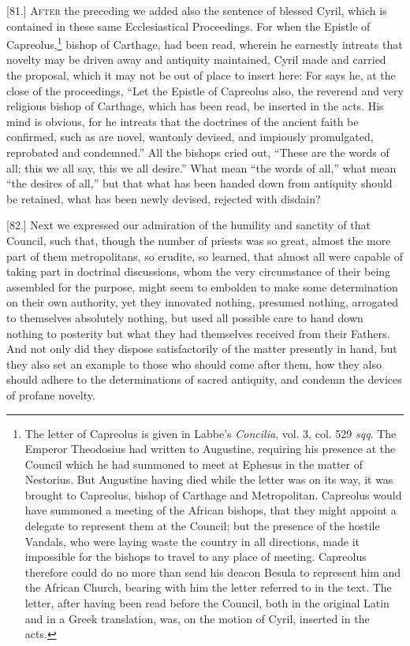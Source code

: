 
[81.] \textsc{After} the preceding we added also the sentence of blessed Cyril, which is contained in these same Ecclesiastical Proceedings. For when the Epistle of Capreolus,\footnote{The letter of Capreolus is given in Labbe’s \emph{Concilia}, vol. 3, col. 529 \emph{sqq}. The Emperor Theodosius had written to Augustine, requiring his presence at the Council which he had summoned to meet at Ephesus in the matter of Nestorius. But Augustine having died while the letter was on its way, it was brought to Capreolus, bishop of Carthage and Metropolitan. Capreolus would have summoned a meeting of the African bishops, that they might appoint a delegate to represent them at the Council; but the presence of the hostile Vandals, who were laying waste the country in all directions, made it impossible for the bishops to travel to any place of meeting. Capreolus therefore could do no more than send his deacon Besula to represent him and the African Church, bearing with him the letter referred to in the text. The letter, after having been read before the Council, both in the original Latin and in a Greek translation, was, on the motion of Cyril, inserted in the acts.} bishop of Carthage, had been read, wherein he earnestly intreats that novelty may be driven away and antiquity maintained, Cyril made and carried the proposal, which it may not be out of place to insert here: For says he, at the close of the proceedings, “Let the Epistle of Capreolus also, the reverend and very religious bishop of Carthage, which has been read, be inserted in the acts. His mind is obvious, for he intreats that the doctrines of the ancient faith be confirmed, such as are novel, wantonly devised, and impiously promulgated, reprobated and condemned.” All the bishops cried out, “These are the words of all; this we all say, this we all desire.” What mean “the words of all,” what mean “the desires of all,” but that what has been handed down from antiquity should be retained, what has been newly devised, rejected with disdain?

[82.] Next we expressed our admiration of the humility and sanctity of that Council, such that, though the number of priests was so great, almost the more part of them metropolitans, so erudite, so learned, that almost all were capable of taking part in doctrinal discussions, whom the very circumstance of their being assembled for the purpose, might seem to embolden to make some determination on their own authority, yet they innovated nothing, presumed nothing, arrogated to themselves absolutely nothing, but used all possible care to hand down nothing to posterity but what they had themselves received from their Fathers. And not only did they dispose satisfactorily of the matter presently in hand, but they also set an example to those who should come after them, how they also should adhere to the determinations of sacred antiquity, and condemn the devices of profane novelty.

